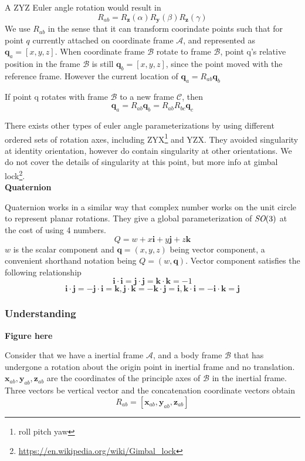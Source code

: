 \documentclass[letterpaper]{article}
\begin{document}
A ZYZ Euler angle rotation would result in
$$ R_{ab} = R_{\mathbf{z}}(\alpha) R_{\mathbf{y}}(\beta) R_{\mathbf{z}}(\gamma) $$
We use $R_{ab}$ in the sense that it can transform coorindate points such that for point $q$ currently attached
on coordinate frame $\mathcal{A}$, and represented as $\mathbf{q}_a = [x, y ,z]$. When coordinate frame $\mathcal{B}$
rotate to frame $\mathcal{B}$, point q's relative position in the frame $\mathcal{B}$ is still $\mathbf{q}_b = [x, y, z]$, since the point
moved with the reference frame. However the current location of $\mathbf{q}_a = R_{ab} \mathbf{q}_b$

If point q rotates with frame $\mathcal{B}$ to a new frame $\mathcal{C}$, then 
$$\mathbf{q}_a = R_{ab}\mathbf{q}_b = R_{ab}R_{bc}\mathbf{q}_c$$

There exists other types of euler angle parameterizations by using different ordered sets of rotation axes,
including ZYX\footnote{roll pitch yaw} and YZX. They avoided singularity at identity orientation, however do contain
singularity at other orientations. We do not cover the details of singularity at this point, but more info at gimbal
lock\footnote{\url{https://en.wikipedia.org/wiki/Gimbal_lock}}. \vspace{1em}\\
\textbf{Quaternion}

Quaternion works in a similar way that complex number works on the unit circle to represent planar rotations. They 
give a global parameterization of $\emph{SO}(3)$ at the cost of using 4 numbers. 
$$Q = w + x\mathbf{i} + y\mathbf{j} + z\mathbf{k}$$
$w$ is the scalar component and $\mathbf{q} = (x, y, z)$ being vector component, a convenient shorthand notation being
$Q = (w, \mathbf{q})$. Vector component satisfies the following relationship
$$\mathbf{i} \cdot \mathbf{i} = \mathbf{j} \cdot \mathbf{j} = \mathbf{k} \cdot \mathbf{k} = -1$$
$$\mathbf{i} \cdot \mathbf{j} = -\mathbf{j} \cdot \mathbf{i} = \mathbf{k}, 
\mathbf{j} \cdot \mathbf{k} = -\mathbf{k} \cdot \mathbf{j} = \mathbf{i},
\mathbf{k} \cdot \mathbf{i} = -\mathbf{i} \cdot \mathbf{k} = \mathbf{j}$$

\subsubsection{Understanding}
\textbf{Figure here}

Consider that we have a inertial frame $\mathcal{A}$, and a body frame $\mathcal{B}$ that has undergone a rotation
about the origin point in inertial frame and no translation. $\mathbf{x}_{ab}, \mathbf{y}_{ab}, \mathbf{z}_{ab}$ are
the coordinates of the principle axes of $\mathcal{B}$ in the inertial frame. Three vectors be vertical vector
and the concatenation coordinate vectors obtain
$$R_{ab} = [\mathbf{x}_{ab}, \mathbf{y}_{ab}, \mathbf{z}_{ab}]$$
\end{document}
